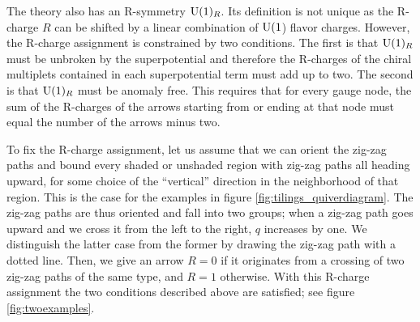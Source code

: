 The theory also has an R-symmetry $\mathrm{U}(1)_{R}$. Its definition is not
unique as the R-charge $R$ can be shifted by a linear combination
of $\mathrm{U}(1$) flavor charges. However, the R-charge assignment is constrained
by two conditions. The first is that $\mathrm{U}(1)_{R}$ must be unbroken
by the superpotential and therefore the R-charges of the chiral multiplets
contained in each superpotential term must add up to two. The second
is that $\mathrm{U}(1)_{R}$ must be anomaly free. This requires that for
every gauge node, the sum of the R-charges of the arrows starting
from or ending at that node must equal the number of the arrows minus
two.

To fix the R-charge assignment, let us assume that we can orient the
zig-zag paths and bound every shaded or unshaded region with zig-zag
paths all heading upward, for some choice of the ``vertical'' direction
in the neighborhood of that region. This is the case for the examples
in figure \ref{fig:tilings_quiverdiagram}. The zig-zag paths are thus oriented
and fall into two groups; when
a zig-zag path goes upward and we cross it from the left to the right,
$q$ increases by one. We distinguish the latter case from the former
by drawing the zig-zag path with a dotted line. Then, we give an arrow
$R=0$ if it originates from a crossing of two zig-zag paths of the
same type, and $R=1$ otherwise. With this R-charge assignment the
two conditions described above are satisfied; see figure \ref{fig:twoexamples}.



